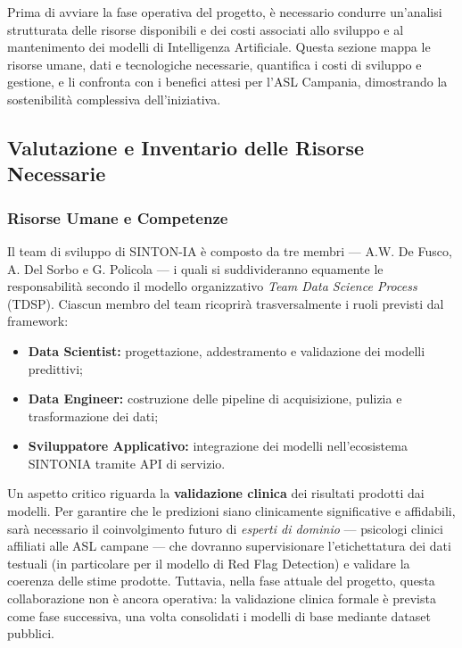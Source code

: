 Prima di avviare la fase operativa del progetto, è necessario condurre un'analisi strutturata delle risorse disponibili e dei costi associati allo sviluppo e al mantenimento dei modelli di Intelligenza Artificiale. Questa sezione mappa le risorse umane, dati e tecnologiche necessarie, quantifica i costi di sviluppo e gestione, e li confronta con i benefici attesi per l'ASL Campania, dimostrando la sostenibilità complessiva dell'iniziativa.

\clearpage
\subsection{Valutazione e Inventario delle Risorse Necessarie}
\label{subsec:inventario_risorse}

\subsubsection{Risorse Umane e Competenze}
\label{subsubsec:risorse_umane}

Il team di sviluppo di SINTON-IA è composto da tre membri --- A.W. De Fusco, A. Del Sorbo e G. Policola --- i quali si suddivideranno equamente le responsabilità secondo il modello organizzativo \textit{Team Data Science Process} (TDSP). Ciascun membro del team ricoprirà trasversalmente i ruoli previsti dal framework:

\begin{itemize}
    \item \textbf{Data Scientist:} progettazione, addestramento e validazione dei modelli predittivi;
    \item \textbf{Data Engineer:} costruzione delle pipeline di acquisizione, pulizia e trasformazione dei dati;
    \item \textbf{Sviluppatore Applicativo:} integrazione dei modelli nell'ecosistema SINTONIA tramite API di servizio.
\end{itemize}

Un aspetto critico riguarda la \textbf{validazione clinica} dei risultati prodotti dai modelli. Per garantire che le predizioni siano clinicamente significative e affidabili, sarà necessario il coinvolgimento futuro di \textit{esperti di dominio} --- psicologi clinici affiliati alle ASL campane --- che dovranno supervisionare l'etichettatura dei dati testuali (in particolare per il modello di Red Flag Detection) e validare la coerenza delle stime prodotte. Tuttavia, nella fase attuale del progetto, questa collaborazione non è ancora operativa: la validazione clinica formale è prevista come fase successiva, una volta consolidati i modelli di base mediante dataset pubblici.

